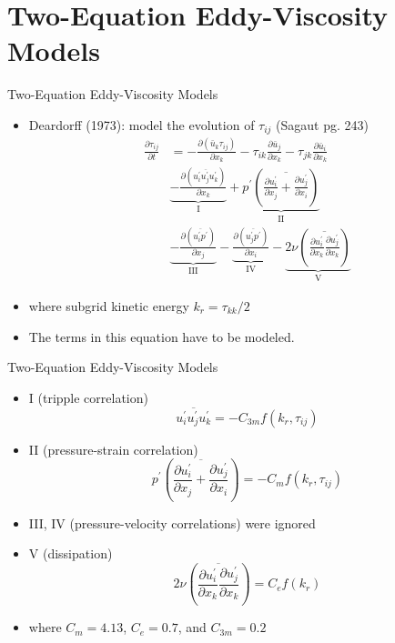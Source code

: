 \section{Two-Equation Eddy-Viscosity Models} %
\begin{frame}{Two-Equation Eddy-Viscosity Models}
\begin{itemize}
	\item Deardorff (1973): model the evolution of $\tau_{ij}$ (Sagaut pg. 243)
	\begin{align*}
		\frac{\partial \tau_{ij}}{\partial t} &= -\frac{\partial (\bar u_k \tau_{ij})}{\partial x_k}	- \tau_{ik}\frac{\partial \bar u_j}{\partial x_k} - \tau_{jk}\frac{\partial \bar u_i}{\partial x_k}\\
		&\underbrace{-\frac{\partial (\overline{u_i^\prime u_j^\prime u_k^\prime})}{\partial x_k}}_{\text{I}} + \underbrace{p^\prime \left(\overline{\frac{\partial u_i^\prime}{\partial x_j} + \frac{\partial u_j^\prime}{\partial x_i}}\right)}_{\text{II}}\\
		&\underbrace{-\frac{\partial (\overline{u_i^\prime p^\prime})}{\partial x_j}}_{\text{III}} -\underbrace{\frac{\partial (\overline{u_j^\prime p^\prime})}{\partial x_i}}_{\text{IV}} -\underbrace{2\nu\left(\overline{\frac{\partial u_i^\prime}{\partial x_k}\frac{\partial u_j^\prime}{\partial x_k}}\right)}_{\text{V}}
	\end{align*}
	\item where subgrid kinetic energy $k_r = \tau_{kk}/2$
  	\item The terms in this equation have to be modeled.
\end{itemize}

\end{frame}

\begin{frame}{Two-Equation Eddy-Viscosity Models}
\begin{itemize}
	\item I (tripple correlation)
	$$\overline{u_i^\prime u_j^\prime u_k^\prime} = -C_{3m} f(k_r, \tau_{ij})$$
	\item II (pressure-strain correlation)
	$$p^\prime \left(\overline{\frac{\partial u_i^\prime}{\partial x_j} + \frac{\partial u_j^\prime}{\partial x_i}}\right) = -C_m f(k_r, \tau_{ij})$$
	\item III, IV (pressure-velocity correlations) were ignored
	\item V (dissipation)
	$$2\nu\left(\overline{\frac{\partial u_i^\prime}{\partial x_k}\frac{\partial u_j^\prime}{\partial x_k}}\right) = C_e f(k_r)$$
	\item where $C_m = 4.13$, $C_e=0.7$, and $C_{3m}=0.2$
  
\end{itemize}

\end{frame}

